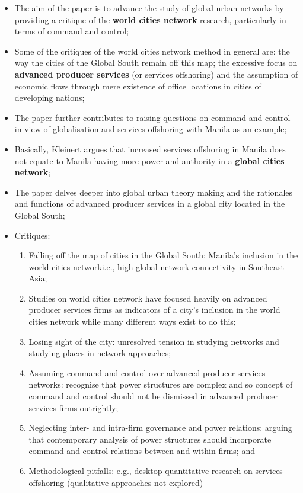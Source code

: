 \documentclass[a4paper, 10.5pt]{article} %
\begin{document}
\begin{itemize}
  \item The aim of the paper is to advance the study of global urban networks by providing a critique of the \textbf{world cities network} research, particularly in terms of command and control;
  \item Some of the critiques of the world cities network method in general are: the way the cities of the Global South remain off this map; the excessive focus on \textbf{advanced producer services} (or services offshoring) and the assumption of economic flows through mere existence of office locations in cities of developing nations;
  \item The paper further contributes to raising questions on command and control in view of globalisation and services offshoring with Manila as an example;
  \item Basically, Kleinert argues that increased services offshoring in Manila does not equate to Manila having more power and authority in a \textbf{global cities network};
  \item The paper delves deeper into global urban theory making and the rationales and functions of advanced producer services in a global city located in the Global South;
  \item Critiques:

  \begin{enumerate}
    \item Falling off the map of cities in the Global South: Manila's inclusion in the world cities network\textemdash{}i.e., high global network connectivity in Southeast Asia;
    \item Studies on world cities network have focused heavily on advanced producer services firms as indicators of a city's inclusion in the world cities network while many different ways exist to do this;
    \item Losing sight of the city: unresolved tension in studying networks and studying places in network approaches;
    \item Assuming command and control over advanced producer services networks: recognise that power structures are complex and so concept of command and control should not be dismissed in advanced producer services firms outrightly;
    \item Neglecting inter- and intra-firm governance and power relations: arguing that contemporary analysis of power structures should incorporate command and control relations between and within firms; and
    \item Methodological pitfalls: e.g., desktop quantitative research on services offshoring (qualitative approaches not explored)
  \end{enumerate}


\end{itemize}
\end{document}
